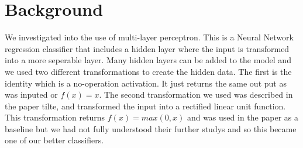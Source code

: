 
\section{Background}
\label{sec:background}

We investigated into the use of multi-layer perceptron. This is a
Neural Network regression classifier that includes a hidden layer
where the input is transformed into a more seperable layer. Many
hidden layers can be added to the model and we used two different
transformations to create the hidden data. The first is the identity
which is a no-operation activation. It just returns the same out put
as was inputed or $f(x)=x$. The second transformation we used was
described in the paper tilte,
and transformed the input into a rectified linear unit function.\cite{milgram} This
transformation returns $f(x)=max(0,x)$ and was used in the paper as a
baseline but we had not fully understood their further studys and so
this became one of our better classifiers. \\





